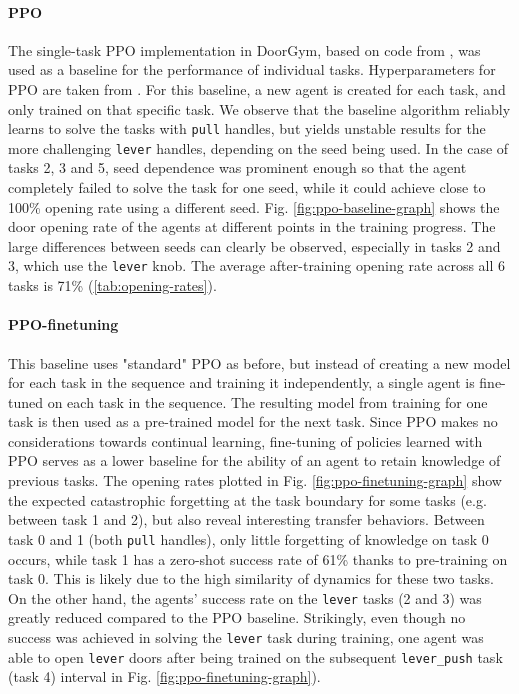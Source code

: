 \documentclass[dvipsnames]{article} %
\newcommand{\comment}[1]{}
\newcommand{\sa}[1] {\comment{{\color{cyan} SA: #1}}}                %
\newcommand{\as}[1] {\comment{{\color{orange} AS: #1}}}              %
\begin{document}
\paragraph{PPO} The single-task PPO implementation in DoorGym, based on code from \citet{pytorchrl}, was used as a baseline for the performance of individual tasks. Hyperparameters for PPO are taken from \citep{doorgym}. For this baseline, a new agent is created for each task, and only trained on that specific task. We observe that the baseline algorithm reliably learns to solve the tasks with \texttt{pull} handles, but yields unstable results for the more challenging \texttt{lever} handles, depending on the seed being used. In the case of tasks 2, 3 and 5, seed dependence was prominent enough so that the agent completely failed to solve the task for one seed, while it could achieve close to 100\% opening rate using a different seed. Fig. \ref{fig:ppo-baseline-graph} shows the door opening rate of the agents at different points in the training progress. The large differences between seeds can clearly be observed, especially in tasks 2 and 3, which use the \texttt{lever} knob. The average after-training opening rate across all 6 tasks is 71\% (\ref{tab:opening-rates}).
\sa{This is where a separate PPO agent is trained on each task, right? Make it more explicit.}


\paragraph{PPO-finetuning} This baseline uses "standard" PPO as before, but instead of creating a new model for each task in the sequence and training it independently, a single agent is fine-tuned on each task in the sequence. The resulting model from training for one task is then used as a pre-trained model for the next task. Since PPO makes no considerations towards continual learning, fine-tuning of policies learned with PPO serves as a lower baseline for the ability of an agent to retain knowledge of previous tasks.
The opening rates plotted in Fig. \ref{fig:ppo-finetuning-graph} show the expected catastrophic forgetting at the task boundary for some tasks (e.g. between task 1 and 2), but also reveal interesting transfer behaviors. Between task 0 and 1 (both \texttt{pull} handles), only little forgetting of knowledge on task 0 occurs, while task 1 has a zero-shot success rate of 61\% thanks to pre-training on task 0. This is likely due to the high similarity of dynamics for these two tasks. On the other hand, the agents' success rate on the \texttt{lever} tasks (2 and 3) was greatly reduced compared to the PPO baseline. Strikingly, even though no success was achieved in solving the \texttt{lever} task during training, one agent was able to open \texttt{lever} doors after being trained on the subsequent \texttt{lever\_push} task (task 4)\as{be consistent with the task fornts. Also I do not know what those numbers refer to in the figure} interval in Fig. \ref{fig:ppo-finetuning-graph}).
\end{document}
